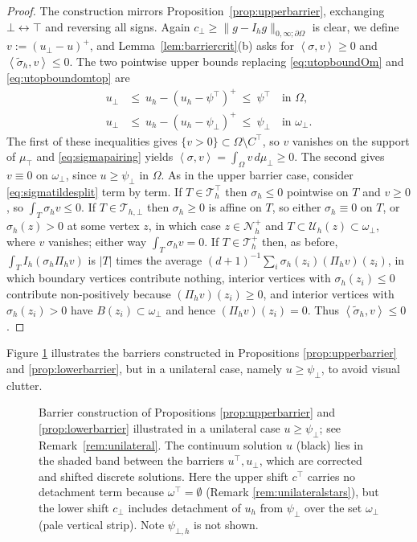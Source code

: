 \documentclass[12pt]{amsart}
\numberwithin{equation}{section}
\theoremstyle{plain}
\theoremstyle{definition}
\theoremstyle{remark}
\newcommand{\Om}{\Omega}
\newcommand{\dOm}{\partial\Omega}
\newcommand{\psilo}{\psi_\bot}
\newcommand{\psiup}{\psi^\top}
\newcommand{\psiloh}{\psi_{\bot,h}}
\newcommand{\Ctop}{C^\top}
\newcommand{\Th}{\mathcal{T}_h}
\newcommand{\Nh}{\mathcal{N}_h}
\newcommand{\Ih}{I_h}
\newcommand{\Pih}{\Pi_h}
\newcommand{\Uh}{\mathcal{U}_h}
\newcommand{\Thbot}{\mathcal{T}_{h,\bot}}
\newcommand{\Thtop}{\Th^\top}
\newcommand{\Thplus}{\Th^+}
\newcommand{\ombot}{\omega_\bot}
\newcommand{\omtop}{\omega^\top}
\begin{document}
\begin{proof}
The construction mirrors Proposition~\ref{prop:upperbarrier}, exchanging $\bot \leftrightarrow \top$ and reversing all signs.  Again $c_\bot \ge \|g-\Ih g\|_{0,\infty;\dOm}$ is clear, we define $v := (u_\bot - u)^+$, and Lemma~\ref{lem:barriercrit}(b) asks for $\left<\sigma,v\right> \ge 0$ and $\left<\tilde\sigma_h,v\right> \le 0$.  The two pointwise upper bounds replacing \eqref{eq:utopboundOm} and \eqref{eq:utopboundomtop} are
\begin{align*}
  u_\bot &\le\ u_h - (u_h - \psiup)^+ \ \le\ \psiup \quad\text{in } \Om, \\
  u_\bot &\le\ u_h - (u_h - \psilo)^+ \ \le\ \psilo \quad\text{in } \ombot.
\end{align*}
The first of these inequalities gives $\{v>0\} \subset \Om \setminus \Ctop$, so $v$ vanishes on the support of $\mu_\top$ and \eqref{eq:sigmapairing} yields $\left<\sigma,v\right> = \int_\Om v \,d\mu_\bot \ge 0$.  The second gives $v \equiv 0$ on $\ombot$, since $u \ge \psilo$ in $\Om$.  As in the upper barrier case, consider \eqref{eq:sigmatildesplit} term by term.  If $T \in \Thtop$ then $\sigma_h \le 0$ pointwise on $T$ and $v \ge 0$, so $\int_T \sigma_h v \le 0$.  If $T \in \Thbot$ then $\sigma_h \ge 0$ is affine on $T$, so either $\sigma_h \equiv 0$ on $T$, or $\sigma_h(z) > 0$ at some vertex $z$, in which case $z \in \Nh^+$ and $T \subset \Uh(z) \subset \ombot$, where $v$ vanishes; either way $\int_T\sigma_h v = 0$.  If $T \in \Thplus$ then, as before, $\int_T \Ih(\sigma_h\Pih v)$ is $|T|$ times the average $(d+1)^{-1}\sum_i \sigma_h(z_i)(\Pih v)(z_i)$, in which boundary vertices contribute nothing, interior vertices with $\sigma_h(z_i) \le 0$ contribute non-positively because $(\Pih v)(z_i) \ge 0$, and interior vertices with $\sigma_h(z_i) > 0$ have $B(z_i) \subset \ombot$ and hence $(\Pih v)(z_i) = 0$.  Thus $\left<\tilde\sigma_h,v\right> \le 0$.
\end{proof}

Figure \ref{fig:barrieruni} illustrates the barriers constructed in Propositions \ref{prop:upperbarrier} and \ref{prop:lowerbarrier}, but in a unilateral case, namely $u\ge \psilo$, to avoid visual clutter.

\begin{figure}[ht]
\centering

\caption{Barrier construction of Propositions \ref{prop:upperbarrier} and \ref{prop:lowerbarrier} illustrated in a unilateral case $u\ge\psilo$; see Remark~\ref{rem:unilateral}.  The continuum solution $u$ (black) lies in the shaded band between the barriers $u^\top,u_\bot$, which are corrected and shifted discrete solutions.  Here the upper shift $c^\top$ carries no detachment term because $\omtop=\emptyset$ (Remark \ref{rem:unilateralstars}), but the lower shift $c_\bot$ includes detachment of $u_h$ from $\psilo$ over the set $\ombot$ (pale vertical strip).  Note $\psiloh$ is not shown.}
\label{fig:barrieruni}
\end{figure}
\end{document}
